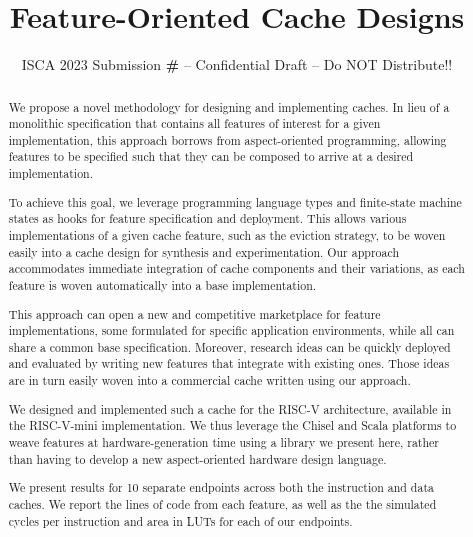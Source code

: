\documentclass[conference]{IEEEtran}
\title{Feature-Oriented Cache Designs}
\author{\normalsize{ISCA 2023 Submission
    \textbf{\#\iscasubmissionnumber} -- Confidential Draft -- Do NOT Distribute!!}}
\begin{document}
\maketitle
\thispagestyle{plain}
\pagestyle{plain}



\def\Riscv{\mbox{RISC-V}}
\def\Riscvmini{\mbox{\Riscv{}-mini}}
\def\Rocketchip{\mbox{Rocket Chip}}

\begin{abstract}
We propose a novel methodology for designing and implementing caches.  In lieu of a monolithic specification that contains all features of interest for a given implementation, this approach borrows from aspect-oriented programming, allowing features to be specified such that they can be composed to arrive at a desired implementation.

To achieve this goal, we leverage programming language types and finite-state machine states as hooks for feature specification and deployment.  This allows various implementations of a given cache feature, such as the eviction strategy, to be woven easily into a cache design for synthesis and experimentation.  Our approach accommodates immediate integration of cache components and their variations, as each feature is woven automatically into a base implementation.

This approach can open a new and competitive marketplace for feature implementations, some formulated for specific application environments, while all can share a common base specification.  Moreover, research ideas can be quickly deployed and evaluated by writing new features that integrate with existing ones.  Those ideas are in turn easily woven into a commercial cache written using our approach. 

We designed and implemented such a cache for the \Riscv{} architecture, available in the \Riscvmini{} implementation.  We thus leverage the
Chisel and Scala platforms to weave features at hardware-generation time using a library we present here, rather than having to develop a new aspect-oriented hardware design language.

We present results for 10 separate endpoints across both the instruction and data caches. We report the lines of code from each feature, as well as the the simulated cycles per instruction and area in LUTs for each of our endpoints.

\end{abstract}
\end{document}
